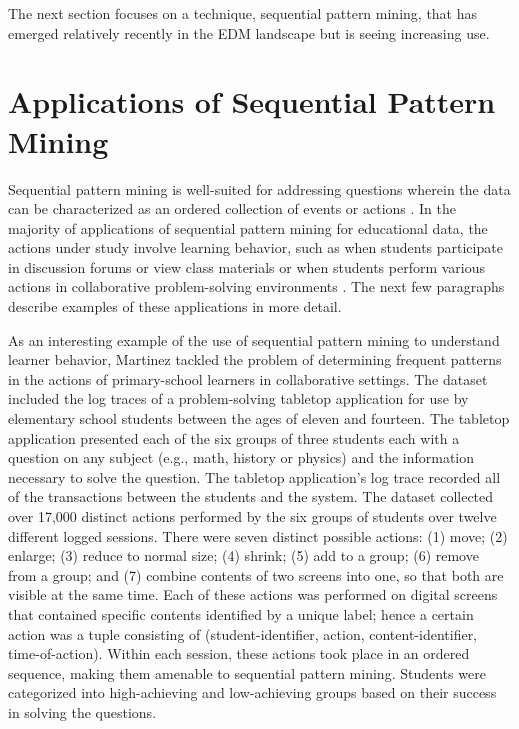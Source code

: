 The next section focuses on a technique, sequential pattern mining, that has emerged relatively recently in the EDM landscape but is seeing increasing use.   

\section{Applications of Sequential Pattern Mining}
\label{section_spm}

Sequential pattern mining is well-suited for addressing questions wherein the data can be characterized as an ordered collection of events or actions \cite{Agrawal}.   In the majority of applications of sequential pattern mining for educational data, the actions under study involve learning behavior, such as when students participate in discussion forums or view class materials \cite{Jiang, Chen} or when students perform various actions in collaborative problem-solving environments \cite{Martinez, Munk, Perera}.  The next few paragraphs describe examples of these applications in more detail.  

As an interesting example of the use of sequential pattern mining to understand learner behavior, Martinez \cite{Martinez} tackled the problem of determining frequent patterns in the actions of primary-school learners in collaborative settings.  The dataset included the log traces of a problem-solving tabletop application for use by elementary school students between the ages of eleven and fourteen.  The tabletop application presented each of the six groups of three students each with a question on any subject (e.g., math, history or physics) and the information necessary to solve the question.  The tabletop application's log trace recorded all of the transactions between the students and the system.  The dataset collected over 17,000 distinct actions performed by the six groups of students over twelve different logged sessions.  There were seven distinct possible actions: (1) move; (2) enlarge; (3) reduce to normal size; (4) shrink; (5) add to a group; (6) remove from a group; and (7) combine contents of two screens into one, so that both are visible at the same time.  Each of these actions was performed on digital screens that contained specific contents identified by a unique label; hence a certain action was a tuple consisting of (student-identifier, action, content-identifier, time-of-action).  Within each session, these actions took place in an ordered sequence, making them amenable to sequential pattern mining.  Students were categorized into high-achieving and low-achieving groups based on their success in solving the questions.  

